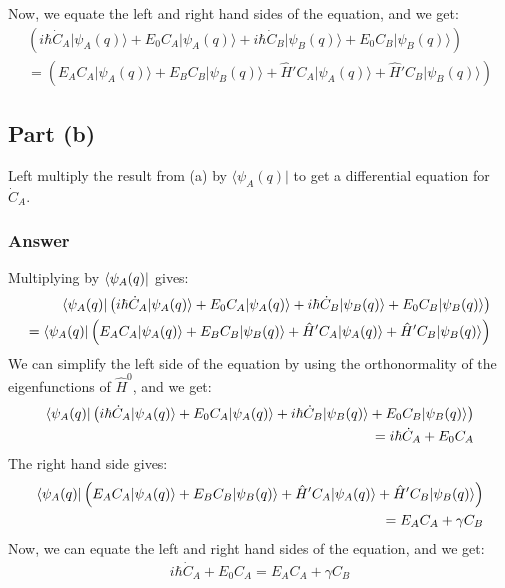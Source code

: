 \documentclass{article}
\begin{document}
Now, we equate the left and right hand sides of the equation, and we get:
\begin{align}
\left( i\hbar\dot{C}_A \lvert \psi_A(q) \rangle + E_0 C_A \lvert \psi_A(q) \rangle + i\hbar\dot{C}_B \lvert \psi_B(q) \rangle + E_0 C_B \lvert \psi_B(q) \rangle \right) \\ = \left( E_A C_A \lvert \psi_A(q) \rangle + E_B C_B \lvert \psi_B(q) \rangle + \hat{H}' C_A \lvert \psi_A(q) \rangle + \hat{H}' C_B \lvert \psi_B(q) \rangle \right)
\end{align}
\subsection{Part (b)}
Left multiply the result from (a) by \( \langle \psi_A(q) \lvert \) to get a differential equation for \( \dot{C}_A \).
\subsubsection{Answer}
Multiplying by $\bra{\psi _A(q)}$ gives:
\begin{align}
\bra{\psi _A(q)} \left( i\hbar\dot{C}_A \lvert \psi_A(q) \rangle + E_0 C_A \lvert \psi_A(q) \rangle + i\hbar\dot{C}_B \lvert \psi_B(q) \rangle + E_0 C_B \lvert \psi_B(q) \rangle \right) \\ = \bra{\psi _A(q)} \left( E_A C_A \lvert \psi_A(q) \rangle + E_B C_B \lvert \psi_B(q) \rangle + \hat{H}' C_A \lvert \psi_A(q) \rangle + \hat{H}' C_B \lvert \psi_B(q) \rangle \right)
\end{align}
We can simplify the left side of the equation by using the orthonormality of the eigenfunctions of \( \hat{H}^0 \), and we get:
\begin{align}
\bra{\psi _A(q)} \left( i\hbar\dot{C}_A \lvert \psi_A(q) \rangle + E_0 C_A \lvert \psi_A(q) \rangle + i\hbar\dot{C}_B \lvert \psi_B(q) \rangle + E_0 C_B \lvert \psi_B(q) \rangle \right) \\ = i \hbar \dot{C}_A + E_0 C_A
\end{align}
The right hand side gives:
\begin{align}
\bra{\psi _A(q)} \left( E_A C_A \lvert \psi_A(q) \rangle + E_B C_B \lvert \psi_B(q) \rangle + \hat{H}' C_A \lvert \psi_A(q) \rangle + \hat{H}' C_B \lvert \psi_B(q) \rangle \right) \\ = E_A C_A + \gamma C_B
\end{align}
Now, we can equate the left and right hand sides of the equation, and we get:
\begin{align}
i \hbar \dot{C}_A + E_0 C_A = E_A C_A + \gamma C_B
\end{align}
\end{document}
